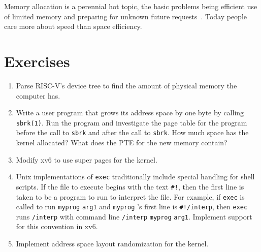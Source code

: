 Memory allocation is a perennial hot topic, the basic problems being
efficient use of limited memory and
preparing for unknown future requests~\cite{knuth}.  Today people care more about speed than
space efficiency.
\section{Exercises}

\begin{enumerate}
  
\item Parse RISC-V's device tree to find the amount of physical memory
the computer has.

\item Write a user program that grows its address space by one byte by calling
\lstinline{sbrk(1)}.
Run the  program and investigate the page table for the program before the call
to
\lstinline{sbrk}
and after the call to
\lstinline{sbrk}.
How much space has the kernel allocated?  What does the
PTE
for the new memory contain?

\item Modify xv6 to use super pages for the kernel.

\item Unix implementations of
\lstinline{exec}
traditionally include special handling for shell scripts.
If the file to execute begins with the text
\lstinline{#!},
then the first line is taken to be a program
to run to interpret the file.
For example, if
\lstinline{exec}
is called to run
\lstinline{myprog}
\lstinline{arg1}
and
\lstinline{myprog} 's
first line is
\lstinline{#!/interp},
then
\lstinline{exec}
runs
\lstinline{/interp}
with command line
\lstinline{/interp}
\lstinline{myprog}
\lstinline{arg1}.
Implement support for this convention in xv6.

\item Implement address space layout randomization for the kernel.

\end{enumerate}


